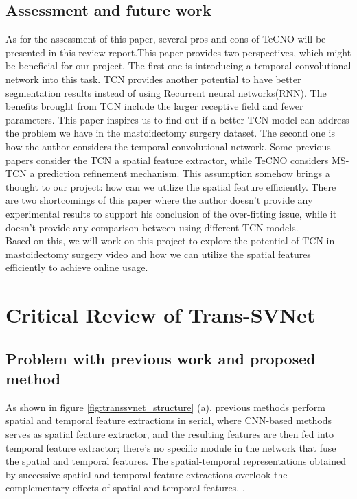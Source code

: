 \documentclass[11pt]{article} \usepackage[top=1in, bottom=1in, left=1in, right=1in]{geometry}
\begin{document}
\subsection{Assessment and future work}
As for the assessment of this paper, several pros and cons of TeCNO will be presented in this review report.This paper provides two perspectives, which might be beneficial for our project. The first one is introducing a temporal convolutional network into this task. TCN provides another potential to have better segmentation results instead of using Recurrent neural networks(RNN). The benefits brought from TCN include the larger receptive field and fewer parameters. This paper inspires us to find out if a better TCN model can address the problem we have in the mastoidectomy surgery dataset. The second one is how the author considers the temporal convolutional network. Some previous papers consider the TCN a spatial feature extractor, while TeCNO considers MS-TCN a prediction refinement mechanism. This assumption somehow brings a thought to our project: how can we utilize the spatial feature efficiently. There are two shortcomings of this paper where the author doesn't provide any experimental results to support his conclusion of the over-fitting issue, while it doesn't provide any comparison between using different TCN models.\\ 
Based on this, we will work on this project to explore the potential of TCN in mastoidectomy surgery video and how we can utilize the spatial features efficiently to achieve online usage. 

\section{Critical Review of Trans-SVNet}
\subsection{Problem with previous work and proposed method}
As shown in figure \ref{fig:transsvnet_structure} (a), previous methods perform spatial and temporal feature extractions in serial, where CNN-based methods serves as spatial feature extractor, and the resulting features are then fed into temporal feature extractor; there's no specific module in the network that fuse the spatial and temporal features. The spatial-temporal representations obtained by successive spatial and temporal feature extractions overlook the complementary effects of spatial and temporal features. \cite{TransSVNet}.
\end{document}
